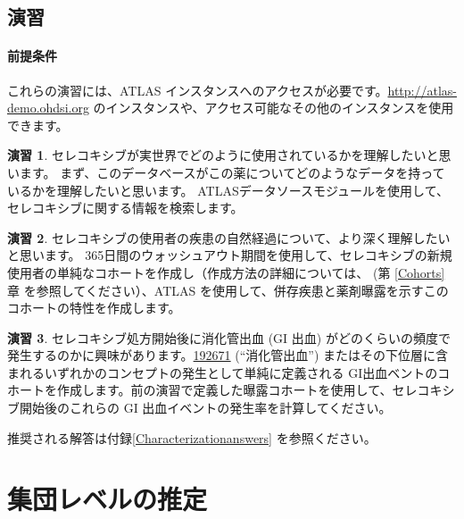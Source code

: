 \documentclass[
  11pt]{book}
\theoremstyle{definition}
\theoremstyle{definition}
\theoremstyle{definition}
\newtheorem{exercise}{演習}[chapter]
\theoremstyle{definition}
\theoremstyle{remark}
\begin{document}
\section{演習}\label{ux6f14ux7fd2-6}

\subsubsection*{前提条件}\label{ux524dux63d0ux6761ux4ef6-6}

これらの演習には、ATLAS インスタンスへのアクセスが必要です。\url{http://atlas-demo.ohdsi.org} のインスタンスや、アクセス可能なその他のインスタンスを使用できます。

\begin{exercise}
\protect\hypertarget{exr:exerciseCharacterization1}{}\label{exr:exerciseCharacterization1}セレコキシブが実世界でどのように使用されているかを理解したいと思います。 まず、このデータベースがこの薬についてどのようなデータを持っているかを理解したいと思います。 ATLASデータソースモジュールを使用して、セレコキシブに関する情報を検索します。
\end{exercise}

\begin{exercise}
\protect\hypertarget{exr:exerciseCharacterization2}{}\label{exr:exerciseCharacterization2}セレコキシブの使用者の疾患の自然経過について、より深く理解したいと思います。 365日間のウォッシュアウト期間を使用して、セレコキシブの新規使用者の単純なコホートを作成し（作成方法の詳細については、 (第 \ref{Cohorts} 章 を参照してください）、ATLAS を使用して、併存疾患と薬剤曝露を示すこのコホートの特性を作成します。
\end{exercise}

\begin{exercise}
\protect\hypertarget{exr:exerciseCharacterization3}{}\label{exr:exerciseCharacterization3}セレコキシブ処方開始後に消化管出血 (GI 出血) がどのくらいの頻度で発生するのかに興味があります。\href{http://athena.ohdsi.org/search-terms/terms/192671}{192671} (``消化管出血'') またはその下位層に含まれるいずれかのコンセプトの発生として単純に定義される GI出血ベントのコホートを作成します。前の演習で定義した曝露コホートを使用して、セレコキシブ開始後のこれらの GI 出血イベントの発生率を計算してください。
\end{exercise}

推奨される解答は付録\ref{Characterizationanswers} を参照ください。

\chapter{集団レベルの推定}\label{PopulationLevelEstimation}
\end{document}
